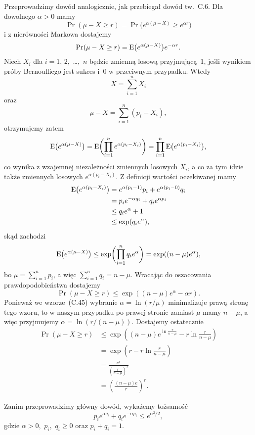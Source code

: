 \exercise{} %
Przeprowadzimy dowód analogicznie, jak przebiegał dowód tw.~C.6. Dla dowolnego $\alpha>0$ mamy
\[
	\Pr(\mu-X\ge r) = \Pr\bigl(e^{\alpha(\mu-X)}\ge e^{\alpha r}\bigr)
\]
i z nierówności Markowa dostajemy
\[
	\Pr(\mu-X\ge r) = \operatorname{E}\bigl(e^{\alpha(\mu-X)}\bigr)e^{-\alpha r}.
\]
Niech $X_i$ dla $i=1$, 2,~\dots,~$n$ będzie zmienną losową przyjmującą~1, jeśli wynikiem  próby Bernoulliego jest sukces i~0 w przeciwnym przypadku. Wtedy
\[
	X = \sum_{i=1}^nX_i
\]
oraz
\[
	\mu-X = \sum_{i=1}^n(p_i-X_i),
\]
otrzymujemy zatem
\[
	\operatorname{E}\bigl(e^{\alpha(\mu-X)}\bigr) = \operatorname{E}\biggl(\prod_{i=1}^ne^{\alpha(p_i-X_i)}\biggr) = \prod_{i=1}^n\operatorname{E}\bigl(e^{\alpha(p_i-X_i)}\bigr),
\]
co wynika z wzajemnej niezależności zmiennych losowych $X_i$, a co za tym idzie także zmiennych losowych $e^{\alpha(p_i-X_i)}$. Z definicji wartości oczekiwanej mamy
\begin{align*}
	\operatorname{E}\bigl(e^{\alpha(p_i-X_i)}\bigr) &= e^{\alpha(p_i-1)}p_i+e^{\alpha(p_i-0)}q_i \\
	&= p_ie^{-\alpha q_i}+q_ie^{\alpha p_i} \\
	&\le q_ie^{\alpha}+1 \\
	&\le \exp(q_ie^\alpha),
\end{align*}
skąd zachodzi
\[
	\operatorname{E}\bigl(e^{\alpha(\mu-X)}\bigr) \le \exp\biggl(\prod_{i=1}^nq_ie^\alpha\biggr) = \exp((n-\mu)e^\alpha),
\]
bo $\mu=\sum_{i=1}^np_i$, a więc $\sum_{i=1}^nq_i=n-\mu$. Wracając do oszacowania prawdopodobieństwa dostajemy
\[
	\Pr(\mu-X\ge r) \le \exp((n-\mu)e^\alpha-\alpha r).
\]
Ponieważ we wzorze~(C.45) wybranie $\alpha=\ln(r/\mu)$ minimalizuje prawą stronę tego wzoru, to w naszym przypadku po prawej stronie zamiast $\mu$ mamy $n-\mu$, a więc przyjmujemy $\alpha=\ln(r/(n-\mu))$. Dostajemy ostatecznie
\begin{align*}
	\Pr(\mu-X\ge r) &\le \exp\left((n-\mu)e^{\ln\frac{r}{n-\mu}}-r\ln\frac{r}{n-\mu}\right) \\
	&= \exp\left(r-r\ln\frac{r}{n-\mu}\right) \\
	&= \frac{e^r}{\left(\frac{r}{n-\mu}\right)^r} \\
	&= \left(\frac{(n-\mu)e}{r}\right)^r.
\end{align*}

\exercise{} %

\noindent Zanim przeprowadzimy główny dowód, wykażemy tożsamość
\begin{equation}
	p_ie^{\alpha q_i}+q_ie^{-\alpha p_i} \le e^{\alpha^2\!/2}, \label{eq:C.5-7_1}
\end{equation}
gdzie $\alpha>0$,~$p_i$,~$q_i\ge0$ oraz $p_i+q_i=1$.

